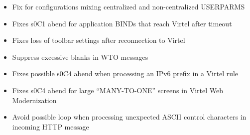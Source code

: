 \documentclass[letterpaper,10pt,english]{sphinxmanual}
\begin{document}
\begin{itemize}
\item {} 
Fix for configurations mixing centralized and non-centralized USERPARMS

\end{itemize}

\begin{itemize}
\item {} 
Fixes s0C1 abend for application BINDs that reach Virtel after timeout

\end{itemize}

\begin{itemize}
\item {} 
Fixes loss of toolbar settings after reconnection to Virtel

\end{itemize}

\begin{itemize}
\item {} 
Suppress excessive blanks in WTO messages

\end{itemize}

\begin{itemize}
\item {} 
Fixes possible s0C4 abend when processing an IPv6 prefix in a Virtel rule

\end{itemize}

\begin{itemize}
\item {} 
Fixes s0C4 abend for large “MANY-TO-ONE” screens in Virtel Web Modernization

\end{itemize}

\begin{itemize}
\item {} 
Avoid possible loop when processing unexpected ASCII control characters in incoming HTTP message

\end{itemize}
\end{document}

